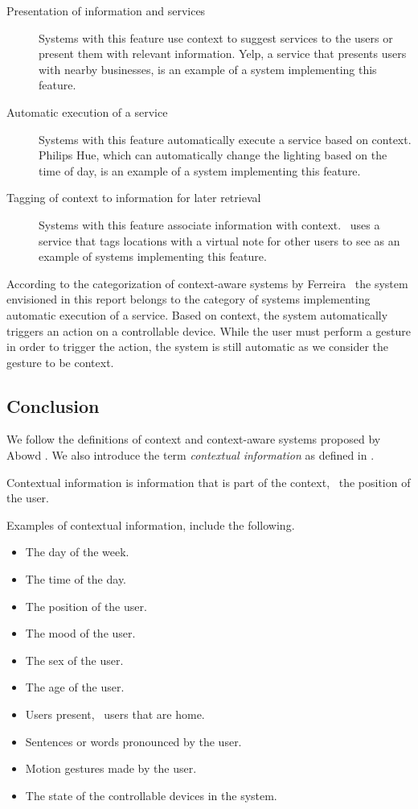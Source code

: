 \begin{description}
\item[Presentation of information and services] Systems with this feature use context to suggest services to the users or present them with relevant information. Yelp, a service that presents users with nearby businesses, is an example of a system implementing this feature.
\item[Automatic execution of a service] Systems with this feature automatically execute a service based on context. Philips Hue, which can automatically change the lighting based on the time of day, is an example of a system implementing this feature.
\item[Tagging of context to information for later retrieval] Systems with this feature associate information with context.~\cite{ferreira2014distributed} uses a service that tags locations with a virtual note for other users to see as an example of systems implementing this feature.
\end{description}

According to the categorization of context-aware systems by Ferreira \etal~the system envisioned in this report belongs to the category of systems implementing automatic execution of a service. Based on context, the system automatically triggers an action on a controllable device. While the user must perform a gesture in order to trigger the action, the system is still automatic as we consider the gesture to be context.

\subsection{Conclusion}

We follow the definitions of context and context-aware systems proposed by Abowd \etal. We also introduce the term \emph{contextual information} as defined in . 

\begin{definition}
\label{def:contextual-information}
Contextual information is information that is part of the context, \eg~the position of the user.
\end{definition}

Examples of contextual information, include the following.

\begin{itemize}
\item The day of the week.
\item The time of the day.
\item The position of the user.
\item The mood of the user.
\item The sex of the user.
\item The age of the user.
\item Users present, \eg~users that are home.
\item Sentences or words pronounced by the user.
\item Motion gestures made by the user.
\item The state of the controllable devices in the system.
\end{itemize}

